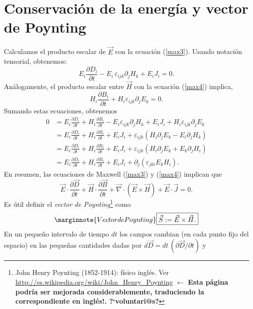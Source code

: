 \section{Conservación de la energía y vector de Poynting}\label{sec:energia}
Calculamos el producto escalar de $\vec{E}$ con la ecuación (\ref{max3}).
Usando notación tensorial, obtenemos:
\begin{equation}
 E_i\frac{\partial D_i}{\partial t}
-E_i\,\varepsilon_{ijk}\partial_jH_k+E_iJ_i=0.
\end{equation}
Análogamente, el producto escalar entre $\vec{H}$ con la ecuación
(\ref{max4}) implica,
\begin{equation}
H_i\frac{\partial B_i}{\partial t} +H_i\varepsilon_{ijk}\partial_jE_k=0.
\end{equation}
Sumando estas ecuaciones, obtenemos
\begin{align}
0 &= E_i\frac{\partial D_i}{\partial t}+H_i\frac{\partial B_i}{\partial t}
-E_i\varepsilon_{ijk}\partial_jH_k+E_iJ_i+H_i\varepsilon
_{ijk}\partial_jE_k\\
 &= E_i\frac{\partial D_i}{\partial t}+H_i\frac{\partial B_i}{\partial
t}+E_iJ_i+\varepsilon_{ijk}\left(H_i\partial_jE_k-E_i\partial_jH_k\right)\\
 &= E_i\frac{\partial D_i}{\partial t}+H_i\frac{\partial B_i}{\partial
t}+E_iJ_i+\varepsilon_{ijk}\left(H_i\partial_jE_k+E_k\partial_jH_i\right)\\
 &= E_i\frac{\partial D_i}{\partial t}+H_i\frac{\partial B_i}{\partial
t}+E_iJ_i+\partial_j(\varepsilon_{jki}E_kH_i).
\end{align}
En resumen, las ecuaciones de Maxwell (\ref{max3}) y (\ref{max4}) implican que
\begin{equation}
\boxed{\vec{E}\cdot\frac{\partial \vec{D}}{\partial
t}+\vec{H}\cdot\frac{\partial\vec{B}}{\partial t}+
\vec\nabla\cdot(\vec{E}\times\vec{H})
+\vec{E}\cdot\vec{J}=0.} \label{cEem0}
\end{equation}
Es útil definir el \textit{vector de Poynting}\footnote{John Henry Poynting (1852-1914): físico inglés. Ver \url{http://es.wikipedia.org/wiki/John_Henry_Poynting} $\leftarrow$ \textbf{Esta página podría ser mejorada considerablemente, traduciendo la correspondiente en inglés!. ?`voluntari@s?}} como
\begin{equation}\label{defPoy}\marginnote{Vector de Poynting}
\boxed{\vec{S}:=\vec{E}\times\vec{H}.}
\end{equation}
En un pequeño intervalo de tiempo $dt$ los campos cambian (en cada punto fijo del espacio) en las pequeñas cantidades dadas por $d\vec{D}=dt\,({\partial \vec{D}}/{\partial t})$ y
